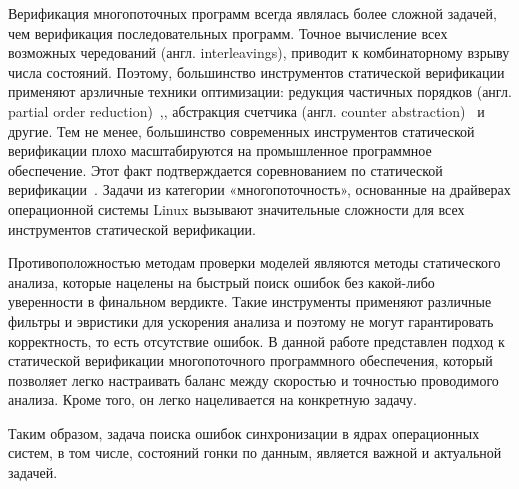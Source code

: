 Верификация многопоточных программ всегда являлась более сложной задачей, чем верификация последовательных программ.
Точное вычисление всех возможных чередований (англ. interleavings), приводит к комбинаторному взрыву числа состояний.
Поэтому, большинство инструментов статической верификации применяют арзличные техники оптимизации: редукция частичных порядков (англ. partial order reduction)~,, абстракция счетчика (англ. counter abstraction)~ и другие.
Тем не менее, большинство современных инструментов статической верификации плохо масштабируются на промышленное программное обеспечение.
Этот факт подтверждается соревнованием по статической верификации~.
Задачи из категории «многопоточность», основанные на драйверах операционной системы Linux вызывают значительные сложности для всех инструментов статической верификации.

Противоположностью методам проверки моделей являются методы статического анализа, которые нацелены на быстрый поиск ошибок без какой-либо уверенности в финальном вердикте.
Такие инструменты применяют различные фильтры и эвристики для ускорения анализа и поэтому не могут гарантировать корректность, то есть отсутствие ошибок.
В данной работе представлен подход к статической верификации многопоточного программного обеспечения, который позволяет легко настраивать баланс между скоростью и точностью проводимого анализа. Кроме того, он легко нацеливается на конкретную задачу.


Таким образом, задача поиска ошибок синхронизации в ядрах операционных систем, в том числе, состояний гонки по данным, является важной и актуальной задачей.

%
%

